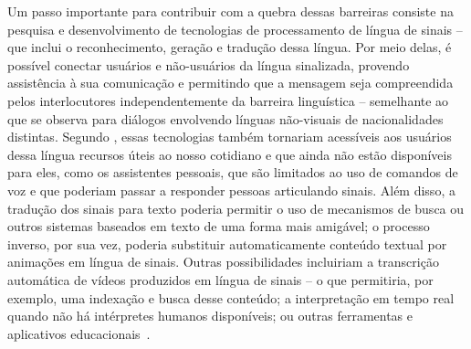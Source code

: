 
Um passo importante para contribuir com a quebra dessas barreiras consiste na pesquisa e desenvolvimento de tecnologias de processamento de língua de sinais -- que inclui o reconhecimento, geração e tradução dessa língua. 
Por meio delas, é possível conectar usuários e não-usuários da língua sinalizada, provendo assistência à sua comunicação e permitindo que a mensagem seja compreendida pelos interlocutores independentemente da barreira linguística -- semelhante ao que se observa para diálogos envolvendo línguas não-visuais de nacionalidades distintas.
Segundo , essas tecnologias também tornariam acessíveis aos usuários dessa língua recursos úteis ao nosso cotidiano e que ainda não estão disponíveis para eles, como os assistentes pessoais, que são limitados ao uso de comandos de voz e que poderiam passar a responder pessoas articulando sinais. Além disso, a tradução dos sinais para texto poderia permitir o uso de mecanismos de busca ou outros sistemas baseados em texto de uma forma mais amigável; o processo inverso, por sua vez, poderia substituir automaticamente conteúdo textual por animações em língua de sinais. Outras possibilidades incluiriam a transcrição automática de vídeos produzidos em língua de sinais -- o que permitiria, por exemplo, uma indexação e busca desse conteúdo; a interpretação em tempo real quando não há intérpretes humanos disponíveis; ou outras ferramentas e aplicativos educacionais~\cite{bragg-2019-slr-interdisciplinary}.


